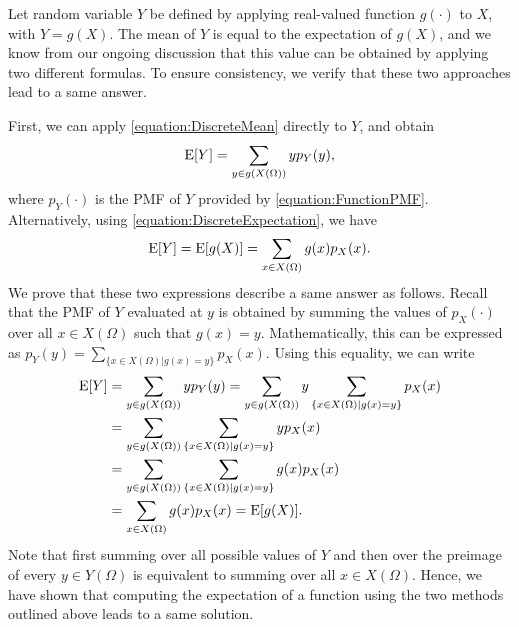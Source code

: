 Let random variable $Y$ be defined by applying real-valued function $g(\cdot)$ to $X$, with $Y = g(X)$.
The mean of $Y$ is equal to the expectation of $g(X)$, and we know from our ongoing discussion that this value can be obtained by applying two different formulas.
To ensure consistency, we verify that these two approaches lead to a same answer.

First, we can apply \eqref{equation:DiscreteMean} directly to $Y$, and obtain
\begin{equation*}
\mathrm{E} [Y] = \sum_{y \in g(X(\Omega))} y p_Y(y),
\end{equation*}
where $p_Y (\cdot)$ is the PMF of $Y$ provided by \eqref{equation:FunctionPMF}.
Alternatively, using \eqref{equation:DiscreteExpectation}, we have
\begin{equation*}
\mathrm{E} [Y] = \mathrm{E} [g(X)] = \sum_{x \in X(\Omega)} g(x) p_X(x) .
\end{equation*}
We prove that these two expressions describe a same answer as follows.
Recall that the PMF of $Y$ evaluated at $y$ is obtained by summing the values of $p_X(\cdot)$ over all $x \in X(\Omega)$ such that $g(x) = y$.
Mathematically, this can be expressed as $p_Y (y) = \sum_{ \{x \in X(\Omega) | g(x) = y \} } p_X (x)$.
Using this equality, we can write
\begin{equation*}
\begin{split}
\mathrm{E} [Y] &= \sum_{y \in g(X(\Omega))} y p_Y(y)
= \sum_{y \in g(X(\Omega))} y
\sum_{\{x \in X(\Omega) | g(x) = y\}} p_X(x) \\
&= \sum_{y \in g(X(\Omega))}
\sum_{\{x \in X(\Omega) | g(x) = y\}} y p_X(x) \\
&= \sum_{y \in g(X(\Omega))}
\sum_{\{x \in X(\Omega) | g(x) = y\}} g(x) p_X(x) \\
&= \sum_{x \in X(\Omega)} g(x) p_X(x)
= \mathrm{E} [g(X)] .
\end{split}
\end{equation*}
Note that first summing over all possible values of $Y$ and then over the preimage of every $y \in Y(\Omega)$ is equivalent to summing over all $x \in X(\Omega)$.
Hence, we have shown that computing the expectation of a function using the two methods outlined above leads to a same solution.

